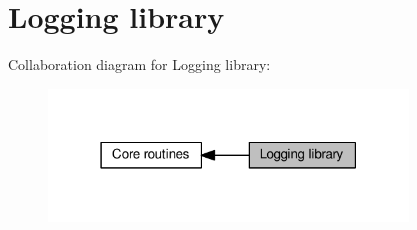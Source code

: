\hypertarget{group__APACHE__CORE__LOG}{}\section{Logging library}
\label{group__APACHE__CORE__LOG}
Collaboration diagram for Logging library\+:
\nopagebreak
\begin{figure}[H]
\begin{center}
\leavevmode
\includegraphics[width=271pt]{group__APACHE__CORE__LOG}
\end{center}
\end{figure}
